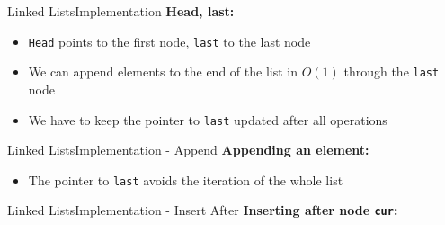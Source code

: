 
\begin{frame}{Linked Lists}{Implementation}
  \textbf{Head, last:}
    \begin{flushleft}
    
  \end{flushleft}
  \begin{itemize}
    \item<3->
      \texttt{Head} points to the first node, \texttt{last} to the last node
    \item<4->
      We can append elements to the end of the list in $O(1)$ through
      the \texttt{last} node
    \item<5->
      We have to keep the pointer to \texttt{last} updated after all operations
  \end{itemize}
\end{frame}


\begin{frame}[fragile]{Linked Lists}{Implementation - Append}
  \textbf{Appending an element:}
  \vspace{-1.0em}
  \begin{flushleft}
    
  \end{flushleft}
  \vspace{-0.5em}
  
  \begin{itemize}
    \item<4->
      The pointer to \texttt{last} avoids the iteration of the whole list
  \end{itemize}
\end{frame}


\begin{frame}{Linked Lists}{Implementation - Insert After}
  \textbf{Inserting after node \texttt{cur}:}
  \begin{flushleft}
    
  \end{flushleft}
\end{frame}

